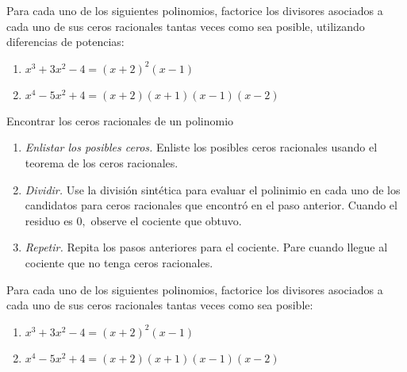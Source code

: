 
	\begin{problema} Para cada uno de los siguientes polinomios, factorice los divisores asociados a cada uno de sus ceros racionales tantas veces como sea posible, utilizando diferencias de potencias:
		
		\begin{enumerate}
			\item $x^{3}+3x^{2}-4={\left(x + 2\right)}^{2} {\left(x - 1\right)}
			$
			\item $x^{4}-5x^{2}+4={\left(x + 2\right)} {\left(x + 1\right)} {\left(x - 1\right)} {\left(x - 2\right)}
			$
		\end{enumerate}
		
		
	\end{problema}


	\begin{algoritmo}{Encontrar los ceros racionales de un polinomio}
		\begin{enumerate}
			\item \emph{Enlistar los posibles ceros.} Enliste los posibles ceros racionales usando el teorema de los ceros racionales.
			\item \emph{Dividir.} Use la divisi\'on sint\'etica para evaluar el polinimio en cada uno de los candidatos para ceros racionales que encontr\'o en el paso anterior. Cuando el residuo es $0,$ observe el cociente que obtuvo.
			\item \emph{Repetir.} Repita los pasos anteriores para el cociente. Pare cuando llegue al cociente que no tenga ceros racionales.
		\end{enumerate}
		
	\end{algoritmo}



	\begin{problema} Para cada uno de los siguientes polinomios, factorice los divisores asociados a cada uno de sus ceros racionales tantas veces como sea posible:
		
		\begin{enumerate}
			\item $x^{3}+3x^{2}-4={\left(x + 2\right)}^{2} {\left(x - 1\right)}
			$
			\item $x^{4}-5x^{2}+4={\left(x + 2\right)} {\left(x + 1\right)} {\left(x - 1\right)} {\left(x - 2\right)}
			$
		\end{enumerate}
		
		
	\end{problema}


